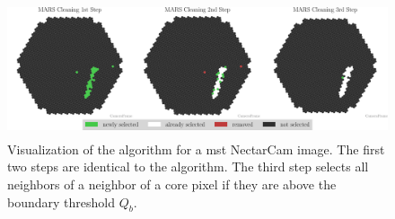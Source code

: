 \begin{figure}
    \centering
    \includegraphics[height=4cm]{plots/cleaner_steps/mars.pdf}
    \caption{Visualization of the \mars{} algorithm for a \gls{mst} NectarCam image. The first two
    steps are identical to the \tailcuts{} algorithm. The third step selects all neighbors of a neighbor of a
    core pixel if they are above the boundary threshold \(Q_b\).}
    \label{fig:mars_cleaning}
\end{figure}

